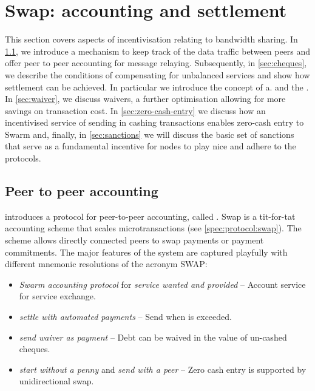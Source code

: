\section{Swap: accounting and settlement\statusgreen}\label{sec:accounting-and-settlement}

\green{}

This section covers aspects of incentivisation relating to bandwidth sharing. 
In \ref{sec:accounting}, we introduce a mechanism to keep track of the data traffic between peers and offer peer to peer accounting for message relaying.
Subsequently, in \ref{sec:cheques}, we describe the conditions of compensating for unbalanced services and show how settlement can be achieved.
In particular we introduce the concept of a.  and the . In \ref{sec:waiver}, we discuss waivers, a further optimisation allowing for more savings on transaction cost. In \ref{sec:zero-cash-entry} we discuss how an incentivised service of sending in cashing transactions enables zero-cash entry to Swarm and, finally, in \ref{sec:sanctions} we will discuss the basic set of sanctions that serve as a fundamental incentive for nodes to play nice and adhere to the protocols.

\subsection{Peer to peer accounting\statusgreen}\label{sec:accounting}


\cite{ethersphere2016sw3} introduces a protocol for peer-to-peer accounting, called . Swap is a tit-for-tat accounting scheme that scales microtransactions (see \ref{spec:protocol:swap}). The scheme allows directly connected peers to swap payments or payment commitments. The major features of the system are captured playfully with different mnemonic resolutions of the acronym SWAP:

\begin{itemize}
    \item \emph{Swarm accounting protocol} for \emph{service wanted and provided} -- Account service for service exchange.
    \item \emph{settle with automated payments} -- Send  when  is exceeded.
    \item \emph{send waiver as payment} -- Debt can be waived in the value of un-cashed cheques. 
    \item \emph{start without a penny} and \emph{send with a peer} -- Zero cash entry is supported by unidirectional swap.
\end{itemize}

